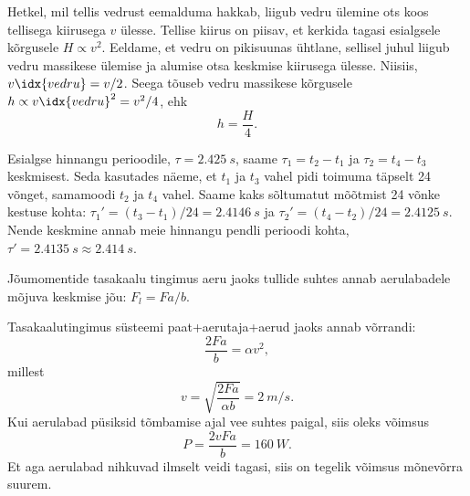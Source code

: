 \documentclass[10pt, twoside]{article}
\begin{document}
{%

\solu
Hetkel, mil tellis vedrust eemalduma hakkab, liigub vedru ülemine ots koos tellisega kiirusega $v$ ülesse. Tellise kiirus on piisav, et kerkida tagasi esialgsele kõrgusele $H\propto v^2$. Eeldame, et vedru on pikisuunas ühtlane, sellisel juhul liigub vedru massikese ülemise ja alumise otsa keskmise kiirusega ülesse. Niisiis, $v\idx{vedru}=v/2$. Seega tõuseb vedru massikese kõrgusele $h\propto v\idx{vedru}^2=v^2/4$, ehk
\[h=\frac{H}{4}.\]
\probend
\bigskip


\solu
Esialgse hinnangu perioodile, $\tau = \SI{2,425}{s}$, saame $\tau_1 = t_2 - t_1$ ja $\tau_2 = t_4 - t_3$
keskmisest. Seda kasutades näeme, et $t_1$ ja $t_3$ vahel pidi toimuma täpselt \num{24} võnget,
samamoodi $t_2$ ja $t_4$ vahel. Saame kaks sõltumatut mõõtmist \num{24} võnke kestuse kohta:
$\tau_1' = (t_3-t_1)/\num{24} = \SI{2,4146}{s}$ ja $\tau_2'= (t_4-t_2)/\num{24} = \SI{2,4125}{s}$. Nende keskmine annab
meie hinnangu pendli perioodi kohta, $\tau' = \SI{2,4135}{s} \approx \SI{2,414}{s}$.
\probend
\bigskip


\solu
Jõumomentide tasakaalu tingimus aeru jaoks tullide suhtes annab aerulabadele mõjuva keskmise jõu: $F_l = F a/b$.

Tasakaalutingimus süsteemi paat+aerutaja+aerud jaoks annab võrrandi: 
\[
\frac{2Fa}{b} = \alpha v^2 ,
\]
millest
\[
v=\sqrt{\frac{2 F a}{\alpha b}}=\SI{2}{m/s}.
\]
Kui aerulabad püsiksid tõmbamise ajal vee suhtes paigal, siis oleks võimsus
\[
P=\frac{2 v F a}{b}=\SI{160}{W}.
\]
Et aga aerulabad nihkuvad ilmselt veidi tagasi, siis on tegelik võimsus mõnevõrra suurem.
\probend
\bigskip


}
\end{document}
